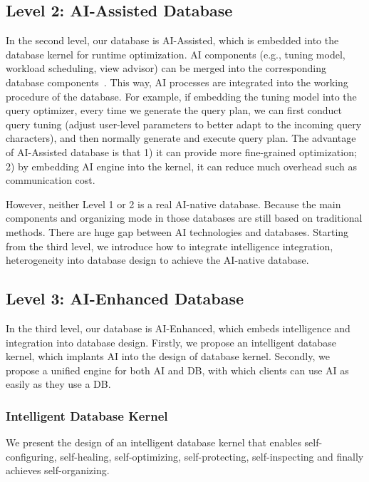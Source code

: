 \subsection{Level 2: AI-Assisted Database}
\label{subsec: assisted}
In the second level, our database is AI-Assisted, which is embedded into the database kernel for runtime optimization. AI components (e.g., tuning model, workload scheduling, view advisor)  can be merged into the corresponding database components~\cite{DBLP:journals/corr/abs-1903-01363}. This way, AI processes are integrated into the working procedure of the database. For example, if embedding the tuning model into the query optimizer, every time we generate the query plan, we can first conduct query tuning (adjust user-level parameters to better adapt to the incoming query characters), and then normally generate and execute query plan. The advantage of AI-Assisted database is that 1) it can provide more fine-grained optimization; 2) by embedding AI engine into the kernel, it can reduce much overhead such as communication cost.

However, neither Level 1 or 2 is a real AI-native database. Because the main components and organizing mode in those databases are still based on traditional methods. There are huge gap between AI technologies and databases. Starting from the third level, we introduce how to integrate intelligence integration, heterogeneity into database design to achieve the AI-native database.

\subsection{Level 3: AI-Enhanced Database}
\label{subsec: enhanced}
In the third level, our database is AI-Enhanced, which embeds intelligence and integration into database design. 
Firstly, we propose an intelligent database kernel, which implants AI into the design of database kernel. Secondly, we propose a  unified engine for both AI and DB, with which clients can use AI as easily as they use a DB.

\subsubsection{Intelligent Database Kernel}
\label{subsubsec: intelligent}
We present the design of an intelligent database kernel that enables self-configuring, self-healing, self-optimizing, self-protecting, self-inspecting and finally achieves self-organizing.

